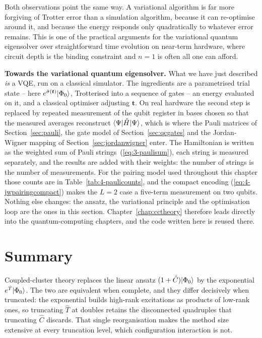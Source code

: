 Both observations point the same way.  A variational algorithm is far more
forgiving of Trotter error than a simulation algorithm, because it can
re-optimise around it, and because the energy responds only quadratically to
whatever error remains.  This is one of the practical arguments for the
variational quantum eigensolver over straightforward time evolution on
near-term hardware, where circuit depth is the binding constraint and $n=1$
is often all one can afford.

\begin{notebox}
\textbf{Towards the variational quantum eigensolver.}  What we have just
described \emph{is} a VQE, run on a classical simulator.  The ingredients are
a parametrised trial state -- here $e^{\hat{\sigma}(\bm{t})}\vert \Phi_0 \rangle$,
Trotterised into a sequence of gates -- an energy evaluated on it, and a
classical optimiser adjusting $\bm{t}$.  On real hardware the second step is
replaced by repeated measurement of the qubit register in bases chosen so
that the measured averages reconstruct
$\langle \Psi | \hat{H} | \Psi \rangle$, which is where the Pauli matrices of
Section~\ref{sec:pauli}, the gate model of Section~\ref{sec:qcgates} and the
Jordan-Wigner mapping of Section~\ref{sec:jordanwigner} enter.  The
Hamiltonian is written as the weighted sum of Pauli
strings~(\ref{eq:3-paulisum}), each string is measured separately, and the
results are added with their weights: the number of strings is the number of
measurements.  For the pairing model used throughout this chapter those
counts are in Table~\ref{tab:4-paulicounts}, and the compact encoding
(\ref{eq:4-jwpairingcompact}) makes the $L=2$ case a five-term measurement on
two qubits.  Nothing else changes: the ansatz, the variational principle and
the optimisation loop are the ones in this section.
Chapter~\ref{chap:cctheory} therefore leads directly into the
quantum-computing chapters, and the code written here is reused there.
\end{notebox}

\section{Summary}
\label{sec:ch10summary}

Coupled-cluster theory replaces the linear ansatz
$(1+\hat{C})\vert \Phi_0 \rangle$ by the exponential $e^{\hat{T}}\vert \Phi_0 \rangle$.
The two are equivalent when complete, and they differ decisively when
truncated: the exponential builds high-rank excitations as products of
low-rank ones, so truncating $\hat{T}$ at doubles retains the disconnected
quadruples that truncating $\hat{C}$ discards.  That single reorganisation
makes the method size extensive at every truncation level, which
configuration interaction is not.


